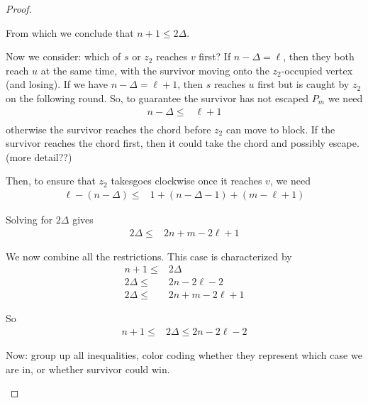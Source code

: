 \documentclass[letterpaper, 10pt]{article}
\begin{document}
\begin{proof}
\begin{proofpart}
From which we conclude that $n+1 \leq 2 \Delta$.

Now we consider: which of $s$ or $z_2$ reaches $v$ first?
If $n - \Delta = \ell$, then they both reach $u$ at the same time,
with the survivor moving onto the $z_2$-occupied vertex (and losing).
If we have $n - \Delta = \ell + 1$, then $s$ reaches $u$ first
but is caught by $z_2$ on the following round.
So, to guarantee the survivor has not escaped $P_m$ we need
\begin{align*}
  n - \Delta \leq & \ell + 1\\
\end{align*}
otherwise the survivor reaches the chord before $z_2$ can move
to block. If the survivor reaches the chord first, then it could
take the chord and possibly escape. (more detail??)

Then, to ensure that $z_2$ takesgoes clockwise once
it reaches $v$, we need
\begin{align*}
  \ell - (n - \Delta) \leq & 1 + (n - \Delta - 1) + (m - \ell + 1)
\end{align*}

Solving for $2\Delta$ gives
\begin{align*}
  2 \Delta \leq & 2n + m - 2\ell + 1
\end{align*}

We now combine all the restrictions. This case is characterized by
\begin{align*}
  n + 1 \leq & 2 \Delta \\
  2 \Delta \leq & 2n - 2 \ell -2 \\
  2 \Delta \leq & 2n + m - 2\ell +1
\end{align*}

So
\begin{align*}
  n + 1 \leq & 2 \Delta \leq 2n - 2\ell -2
\end{align*}

Now: group up all inequalities, color coding whether they represent
which case we are in, or whether survivor could win.
\end{proofpart}

\end{proof}
\end{document}
